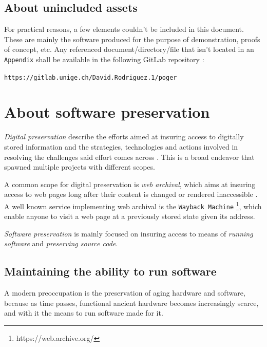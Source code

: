 \documentclass[11pt]{article}
\begin{document}
\subsection{About unincluded assets}

For practical reasons, a few elements couldn't be included in this document. These are mainly the software produced for the purpose of demonstration, proofs of concept, etc. Any referenced document/directory/file that isn't located in an \texttt{Appendix} shall be available in the following GitLab repository :

\begin{center}
	\texttt{https://gitlab.unige.ch/David.Rodriguez.1/poger}
\end{center}





\newpage

\section{About software preservation}

\textit{Digital preservation} describe the efforts aimed at insuring access to digitally stored information and the strategies, technologies and actions involved in resolving the challenges said effort comes across \cite{digipresdef,lee2002state}. This is a broad endeavor that spawned multiple projects with different scopes.

A common scope for digital preservation is \textit{web archival}, which aims at insuring access to web pages long after their content is changed or rendered inaccessible \cite{masanes2006web}. A well known service implementing web archival is the \texttt{Wayback Machine} \footnote[1]{https://web.archive.org/}, which enable anyone to visit a web page at a previously stored state given its address.

\textit{Software preservation} is mainly focused on insuring access to means of \textit{running software} and \textit{preserving source code}.


\subsection{Maintaining the ability to run software}

A modern preoccupation is the preservation of aging hardware and software, because as time passes, functional ancient hardware becomes increasingly scarce, and with it the means to run software made for it.
\end{document}
